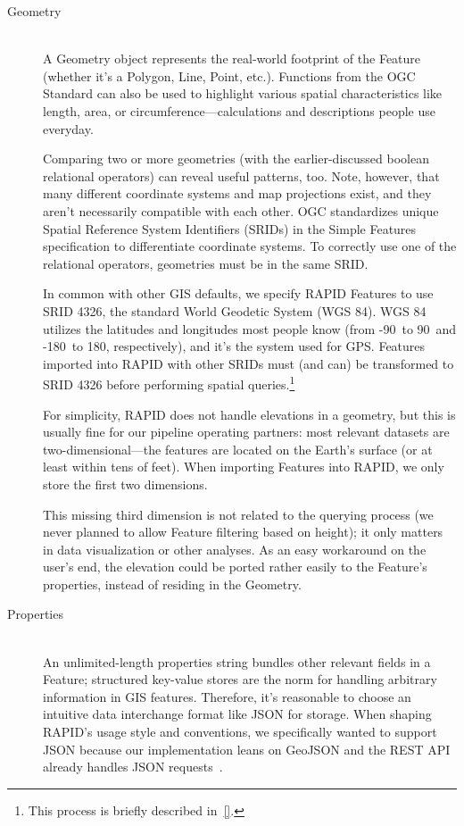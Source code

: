 \begin{description}
  \item[Geometry] \hfill \\
  A Geometry object represents the real-world footprint of the Feature (whether it's a Polygon, Line, Point, etc.). Functions from the OGC Standard can also be used to highlight various spatial characteristics like length, area, or circumference---calculations and descriptions people use everyday. 
  
  Comparing two or more geometries (with the earlier-discussed boolean relational operators) can reveal useful patterns, too. Note, however, that many different coordinate systems and map projections exist, and they aren't necessarily compatible with each other. OGC standardizes unique Spatial Reference System Identifiers (SRIDs) in the Simple Features specification to differentiate coordinate systems. To correctly use one of the relational operators, geometries must be in the same SRID.
  
   In common with other GIS defaults, we specify RAPID Features to use SRID 4326, the standard World Geodetic System (WGS 84). WGS 84 utilizes the latitudes and longitudes most people know (from -90\textdegree~to 90\textdegree~and -180\textdegree~to 180\textdegree, respectively), and it's the system used for GPS. Features imported into RAPID with other SRIDs must (and can) be transformed to SRID 4326 before performing spatial queries.\footnote{This process is briefly described in~\ref{}.}
   
   For simplicity, RAPID does not handle elevations in a geometry, but this is usually fine for our pipeline operating partners: most relevant datasets are two-dimensional---the features are located on the Earth's surface (or at least within tens of feet). When importing Features into RAPID, we only store the first two dimensions.
   
   This missing third dimension is not related to the querying process (we never planned to allow Feature filtering based on height); it only matters in data visualization or other analyses. As an easy workaround on the user's end, the elevation could be ported rather easily to the Feature's properties, instead of residing in the Geometry.
  
  \item[Properties] \hfill \\
  An unlimited-length properties string bundles other relevant fields in a Feature; structured key-value stores are the norm for handling arbitrary information in GIS features. Therefore, it's reasonable to choose an intuitive data interchange format like JSON for storage. When shaping RAPID's usage style and conventions, we specifically wanted to support JSON because our implementation leans on GeoJSON and the REST API already handles JSON requests~\cite{alexa}.
  

\end{description}
